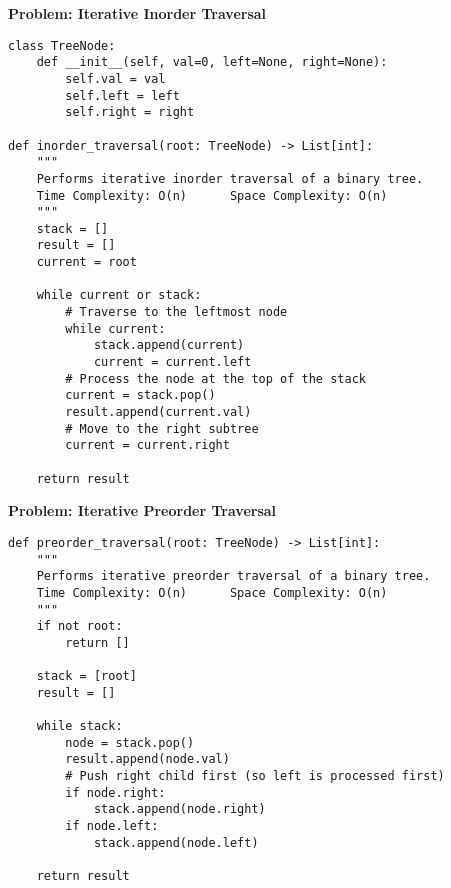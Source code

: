 % 
% 
\noindent\textbf{Problem: Iterative Inorder Traversal}
\begin{verbatim}
class TreeNode:
    def __init__(self, val=0, left=None, right=None):
        self.val = val
        self.left = left
        self.right = right

def inorder_traversal(root: TreeNode) -> List[int]:
    """
    Performs iterative inorder traversal of a binary tree.
    Time Complexity: O(n)      Space Complexity: O(n)
    """
    stack = []
    result = []
    current = root
    
    while current or stack:
        # Traverse to the leftmost node
        while current:
            stack.append(current)
            current = current.left
        # Process the node at the top of the stack
        current = stack.pop()
        result.append(current.val)
        # Move to the right subtree
        current = current.right
    
    return result
\end{verbatim}

\noindent\textbf{Problem: Iterative Preorder Traversal}
\begin{verbatim}
def preorder_traversal(root: TreeNode) -> List[int]:
    """
    Performs iterative preorder traversal of a binary tree.
    Time Complexity: O(n)      Space Complexity: O(n)
    """
    if not root:
        return []
    
    stack = [root]
    result = []
    
    while stack:
        node = stack.pop()
        result.append(node.val)
        # Push right child first (so left is processed first)
        if node.right:
            stack.append(node.right)
        if node.left:
            stack.append(node.left)
    
    return result
\end{verbatim}

